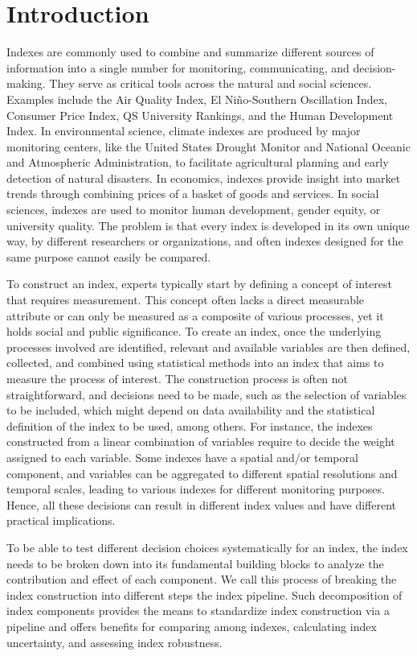 \documentclass[
]{interact}
\begin{document}
\hypertarget{introduction}{%
\section{Introduction}\label{introduction}}

Indexes are commonly used to combine and summarize different sources of
information into a single number for monitoring, communicating, and
decision-making. They serve as critical tools across the natural and
social sciences. Examples include the Air Quality Index, El
Niño-Southern Oscillation Index, Consumer Price Index, QS University
Rankings, and the Human Development Index. In environmental science,
climate indexes are produced by major monitoring centers, like the
United States Drought Monitor and National Oceanic and Atmospheric
Administration, to facilitate agricultural planning and early detection
of natural disasters. In economics, indexes provide insight into market
trends through combining prices of a basket of goods and services. In
social sciences, indexes are used to monitor human development, gender
equity, or university quality. The problem is that every index is
developed in its own unique way, by different researchers or
organizations, and often indexes designed for the same purpose cannot
easily be compared.

To construct an index, experts typically start by defining a concept of
interest that requires measurement. This concept often lacks a direct
measurable attribute or can only be measured as a composite of various
processes, yet it holds social and public significance. To create an
index, once the underlying processes involved are identified, relevant
and available variables are then defined, collected, and combined using
statistical methods into an index that aims to measure the process of
interest. The construction process is often not straightforward, and
decisions need to be made, such as the selection of variables to be
included, which might depend on data availability and the statistical
definition of the index to be used, among others. For instance, the
indexes constructed from a linear combination of variables require to
decide the weight assigned to each variable. Some indexes have a spatial
and/or temporal component, and variables can be aggregated to different
spatial resolutions and temporal scales, leading to various indexes for
different monitoring purposes. Hence, all these decisions can result in
different index values and have different practical implications.

To be able to test different decision choices systematically for an
index, the index needs to be broken down into its fundamental building
blocks to analyze the contribution and effect of each component. We call
this process of breaking the index construction into different steps the
index pipeline. Such decomposition of index components provides the
means to standardize index construction via a pipeline and offers
benefits for comparing among indexes, calculating index uncertainty, and
assessing index robustness.
\end{document}
